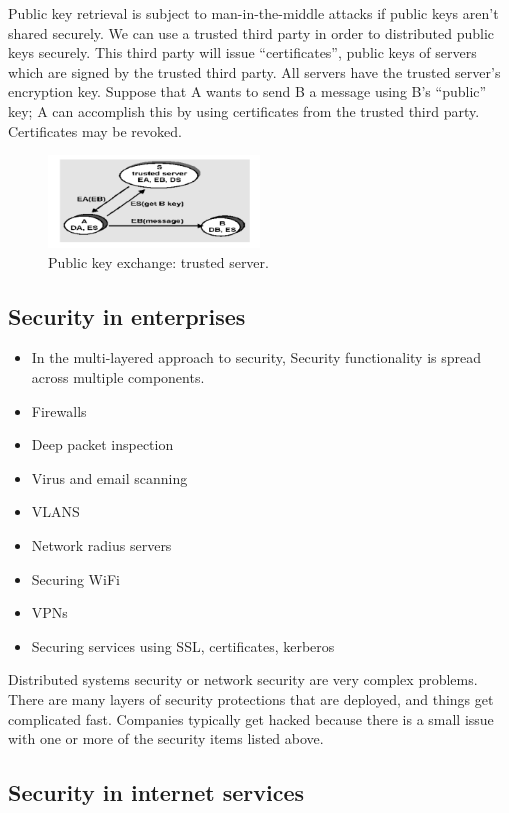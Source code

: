 \documentclass[twoside]{article}
\begin{document}
Public key retrieval is subject to man-in-the-middle attacks if public keys aren't shared securely. We can use a trusted third party in order to distributed public keys securely. This third party will issue ``certificates'', public keys of servers which are signed by the trusted third party. All servers have the trusted server's encryption key. Suppose that A wants to send B a message using B's ``public'' key; A can accomplish this by using certificates from the trusted third party. Certificates may be revoked.

\begin{figure}[H]
\centering
\includegraphics[width=0.5\textwidth]{pke_trusted.png}
\caption{Public key exchange: trusted server.}
\end{figure}

\subsection{Security in enterprises}

\begin{itemize}
\item In the multi-layered approach to security, Security functionality is spread across multiple components.
\item Firewalls
\item Deep packet inspection
\item Virus and email scanning
\item VLANS
\item Network radius servers
\item Securing WiFi
\item VPNs
\item Securing services using SSL, certificates, kerberos
\end{itemize}

Distributed systems security or network security are very complex problems. There are many layers of security protections that are deployed, and things get complicated fast. Companies typically get hacked because there is a small issue with one or more of the security items listed above.

\subsection{Security in internet services}
\end{document}
